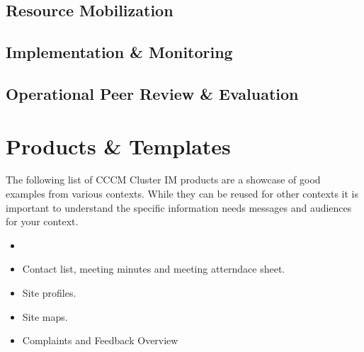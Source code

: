 \documentclass[letterpaper,10pt,english]{jupyterBook}
\begin{document}
\section{Resource Mobilization}
\label{\detokenize{part3/resource mobilization:resource-mobilization}}\label{\detokenize{part3/resource mobilization::doc}}

\section{Implementation \& Monitoring}
\label{\detokenize{part3/implementation and monitoring:implementation-monitoring}}\label{\detokenize{part3/implementation and monitoring::doc}}

\section{Operational Peer Review \& Evaluation}
\label{\detokenize{part3/opr:operational-peer-review-evaluation}}\label{\detokenize{part3/opr::doc}}

\chapter{Products \& Templates}
\label{\detokenize{part3/products:products-templates}}\label{\detokenize{part3/products::doc}}
\sphinxAtStartPar
The following list of CCCM Cluster IM products are a showcase of good examples from various contexts. While they can be reused for other contexts it is important to understand the specific information needs messages and audiences for your context.
\begin{itemize}
\item {} 
\sphinxAtStartPar
{}

\item {} 
\sphinxAtStartPar
Contact list, meeting minutes and meeting atterndace sheet.

\item {} 
\sphinxAtStartPar
Site profiles.

\item {} 
\sphinxAtStartPar
Site maps.

\item {} 
\sphinxAtStartPar
Complaints and Feedback Overview

\end{itemize}
\end{document}
